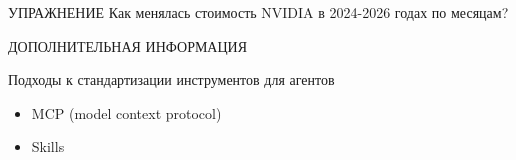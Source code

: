 \documentclass[aspectratio=169]{beamer}
\begin{document}
{\begin{frame}{УПРАЖНЕНИЕ}
    Как менялась стоимость NVIDIA в 2024-2026 годах по месяцам?
    
    
    
\end{frame}  


\begin{frame}{ДОПОЛНИТЕЛЬНАЯ ИНФОРМАЦИЯ}
    
    Подходы к стандартизации инструментов для агентов
    
    \begin{itemize}
        \item [-] MCP (model context protocol)
        \item [-] Skills         
    \end{itemize}        
    
\end{frame}  


     } %
     
\end{document}
